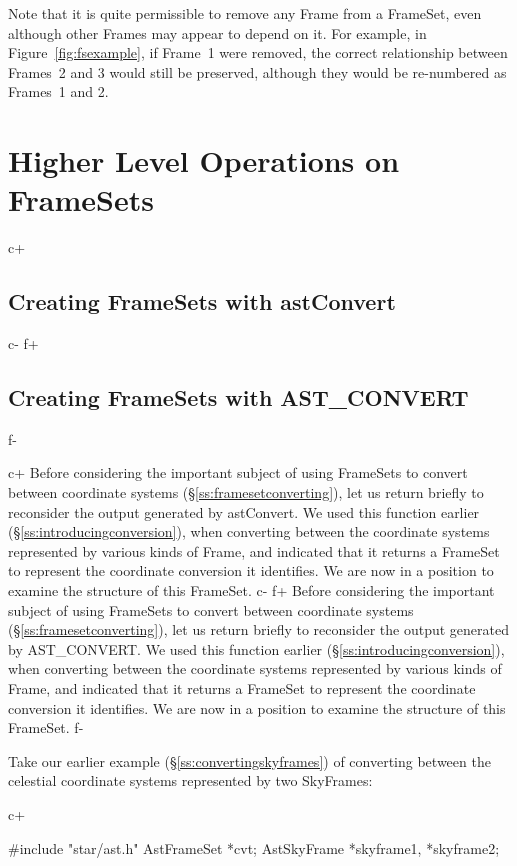 \documentclass[twoside,11pt]{starlink}
\providecommand{\secref}[1]{\S\ref{#1}}
\begin{document}
{Note that it is quite permissible to remove any Frame from a FrameSet,
even although other Frames may appear to depend on it. For example, in
Figure~\ref{fig:fsexample}, if Frame~1 were removed, the correct
relationship between Frames~2 and 3 would still be preserved, although
they would be re-numbered as Frames~1 and 2.

\cleardoublepage
\section{\label{ss:fshigher}Higher Level Operations on FrameSets}

c+
\subsection{\label{ss:framesetsfromconvert}Creating FrameSets with astConvert}
c-
f+
\subsection{\label{ss:framesetsfromconvert}Creating FrameSets with AST\_CONVERT}
f-

c+
Before considering the important subject of using FrameSets to convert
between coordinate systems (\secref{ss:framesetconverting}), let us
return briefly to reconsider the output generated by astConvert. We
used this function earlier (\secref{ss:introducingconversion}), when
converting between the coordinate systems represented by various kinds
of Frame, and indicated that it returns a FrameSet to represent the
coordinate conversion it identifies. We are now in a position to
examine the structure of this FrameSet.
c-
f+
Before considering the important subject of using FrameSets to convert
between coordinate systems (\secref{ss:framesetconverting}), let us
return briefly to reconsider the output generated by AST\_CONVERT. We
used this function earlier (\secref{ss:introducingconversion}), when
converting between the coordinate systems represented by various kinds
of Frame, and indicated that it returns a FrameSet to represent the
coordinate conversion it identifies. We are now in a position to
examine the structure of this FrameSet.
f-

Take our earlier example (\secref{ss:convertingskyframes}) of
converting between the celestial coordinate systems represented by two
SkyFrames:

c+
\small
\begin{terminalv}
#include "star/ast.h"
AstFrameSet *cvt;
AstSkyFrame *skyframe1, *skyframe2;


\end{terminalv}}
\end{document}
